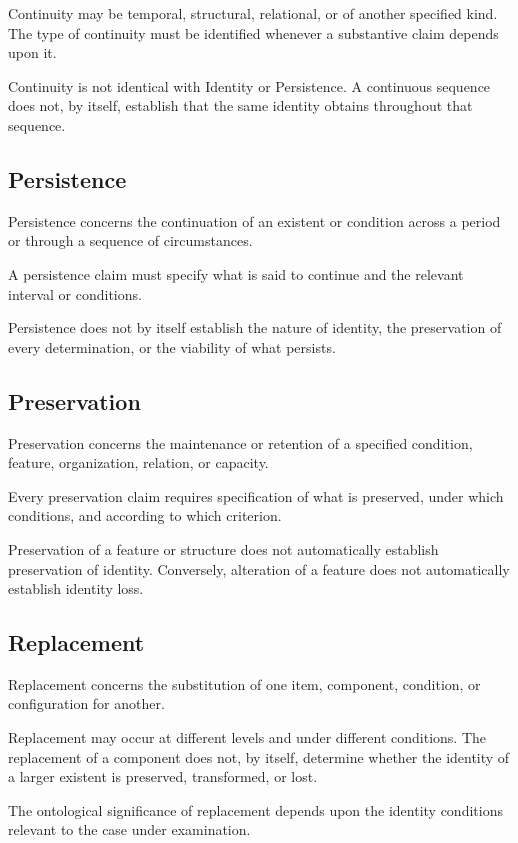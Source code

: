Continuity may be temporal, structural, relational, or of another
specified kind. The type of continuity must be identified whenever
a substantive claim depends upon it.

Continuity is not identical with Identity or Persistence. A continuous
sequence does not, by itself, establish that the same identity obtains
throughout that sequence.


\subsection*{Persistence}

Persistence concerns the continuation of an existent or condition
across a period or through a sequence of circumstances.

A persistence claim must specify what is said to continue and the
relevant interval or conditions.

Persistence does not by itself establish the nature of identity,
the preservation of every determination, or the viability of what
persists.


\subsection*{Preservation}

Preservation concerns the maintenance or retention of a specified
condition, feature, organization, relation, or capacity.

Every preservation claim requires specification of what is preserved,
under which conditions, and according to which criterion.

Preservation of a feature or structure does not automatically establish
preservation of identity. Conversely, alteration of a feature does
not automatically establish identity loss.


\subsection*{Replacement}

Replacement concerns the substitution of one item, component, condition,
or configuration for another.

Replacement may occur at different levels and under different
conditions. The replacement of a component does not, by itself,
determine whether the identity of a larger existent is preserved,
transformed, or lost.

The ontological significance of replacement depends upon the identity
conditions relevant to the case under examination.


